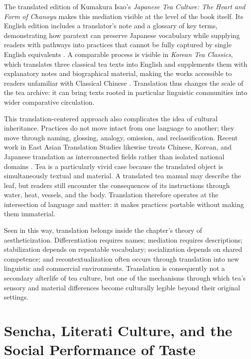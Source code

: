 \documentclass[numbers]{IntechOpen-Book}
\begin{document}
The translated edition of Kumakura Isao's \textit{Japanese Tea Culture: The Heart and Form of Chanoyu} makes this mediation visible at the level of the book itself. Its English edition includes a translator's note and a glossary of key terms, demonstrating how paratext can preserve Japanese vocabulary while supplying readers with pathways into practices that cannot be fully captured by single English equivalents \cite{kumakura}. A comparable process is visible in \textit{Korean Tea Classics}, which translates three classical tea texts into English and supplements them with explanatory notes and biographical material, making the works accessible to readers unfamiliar with Classical Chinese \cite{koreanteaclassics}. Translation thus changes the scale of the tea archive: it can bring texts rooted in particular linguistic communities into wider comparative circulation.

This translation-centered approach also complicates the idea of cultural inheritance. Practices do not move intact from one language to another; they move through naming, glossing, analogy, omission, and reclassification. Recent work in East Asian Translation Studies likewise treats Chinese, Korean, and Japanese translation as interconnected fields rather than isolated national domains \cite{xu}. Tea is a particularly vivid case because the translated object is simultaneously textual and material. A translated tea manual may describe the leaf, but readers still encounter the consequences of its instructions through water, heat, vessels, and the body. Translation therefore operates at the intersection of language and matter: it makes practices portable without making them immaterial.

Seen in this way, translation belongs inside the chapter's theory of aestheticization. Differentiation requires names; mediation requires descriptions; stabilization depends on repeatable vocabulary; socialization depends on shared competence; and recontextualization often occurs through translation into new linguistic and commercial environments. Translation is consequently not a secondary afterlife of tea culture, but one of the mechanisms through which tea's sensory and material differences become culturally legible beyond their original settings.

\section{Sencha, Literati Culture, and the Social Performance of Taste}
\end{document}
